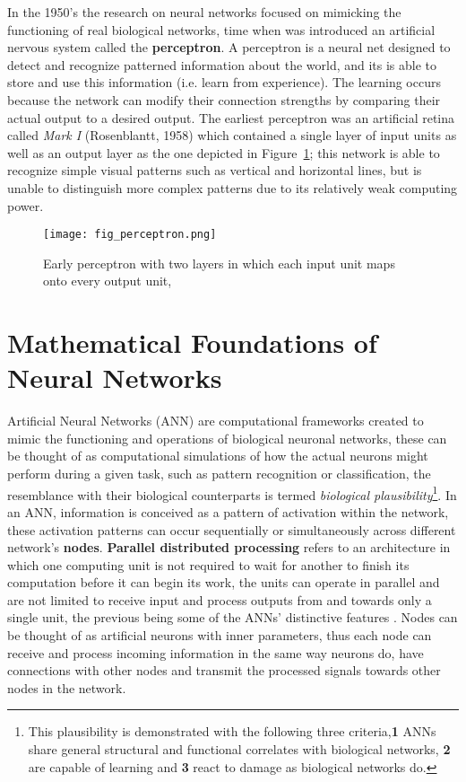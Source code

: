 \documentclass{WileySev}
\begin{document}
In the 1950's the research on neural networks focused on mimicking the functioning of real biological networks, time when was introduced an artificial nervous system called the \textbf{perceptron}. A perceptron is a neural net designed to detect and recognize patterned information about the world, and its is able to store and use this information (i.e. learn from experience). The learning occurs because the network can modify their connection strengths by comparing their actual output to a desired output. The earliest perceptron was an artificial retina called \textit{Mark I} (Rosenblantt, 1958) which contained a single layer of input units as well as an output layer as the one depicted in Figure~\ref{fig:perceptron}; this network is able to recognize simple visual patterns such as vertical and horizontal lines, but is unable to distinguish more complex patterns due to its relatively weak computing power.

\begin{figure}
 \texttt{[image: fig\_perceptron.png]}
  \centering
  \caption{Early perceptron with two layers in which each input unit maps onto every output unit, \cite{friedenberg2011cognitive}}
  \label{fig:perceptron}
\end{figure} 

\section{Mathematical Foundations of Neural Networks} \label{sec:math_foundations}

Artificial Neural Networks (ANN) are computational frameworks created to mimic the functioning and operations of biological neuronal networks, these can be thought of as computational simulations of how the actual neurons might perform during a given task, such as pattern recognition or classification, the resemblance with their biological counterparts is termed \textit{biological plausibility}\footnote{This plausibility is demonstrated with the following three criteria,\textbf{1} ANNs share general structural and functional correlates with biological networks, \textbf{2} are capable of learning and \textbf{3} react to damage as biological networks do.}. In an ANN, information is conceived as a pattern of activation within the network, these activation patterns can occur sequentially or simultaneously across different network's \textbf{nodes}. \textbf{Parallel distributed processing} refers to an architecture in which one computing unit is not required to wait for another to finish its computation before it can begin its work, the units can operate in parallel and are not limited to receive input and process outputs from and towards only a single unit, the previous being some of the ANNs' distinctive features \cite[chap. 7]{friedenberg2011cognitive}. Nodes can be thought of as artificial neurons with inner parameters, thus each node can receive and process incoming information in the same way neurons do, have connections with other nodes and transmit the processed signals towards other nodes in the network.
\end{document}
